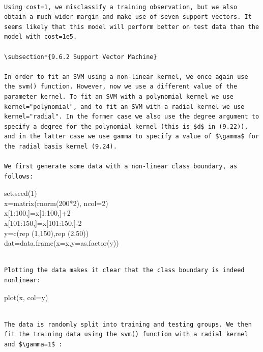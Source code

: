 \documentclass[10pt]{article}
\begin{document}
\begin{verbatim}

Using cost=1, we misclassify a training observation, but we also obtain a much wider margin and make use of seven support vectors. It seems likely that this model will perform better on test data than the model with cost=1e5.

\subsection*{9.6.2 Support Vector Machine}

In order to fit an SVM using a non-linear kernel, we once again use the svm() function. However, now we use a different value of the parameter kernel. To fit an SVM with a polynomial kernel we use kernel="polynomial", and to fit an SVM with a radial kernel we use kernel="radial". In the former case we also use the degree argument to specify a degree for the polynomial kernel (this is $d$ in (9.22)), and in the latter case we use gamma to specify a value of $\gamma$ for the radial basis kernel (9.24).

We first generate some data with a non-linear class boundary, as follows:
\end{verbatim}

\begin{displayquote}
set.seed(1)\\
x=matrix(rnorm(200*2), ncol=2)\\[0pt]
x[1:100,]=x[1:100,]+2\\[0pt]
x[101:150,]=x[101:150,]-2\\
y=c(rep (1,150),rep (2,50))\\
dat=data.frame(x=x,y=as.factor(y))
\end{displayquote}

\begin{verbatim}

Plotting the data makes it clear that the class boundary is indeed nonlinear:
\end{verbatim}

\begin{displayquote}
plot(x, col=y)
\end{displayquote}

\begin{verbatim}

The data is randomly split into training and testing groups. We then fit the training data using the svm() function with a radial kernel and $\gamma=1$ :
\end{verbatim}
\end{document}
